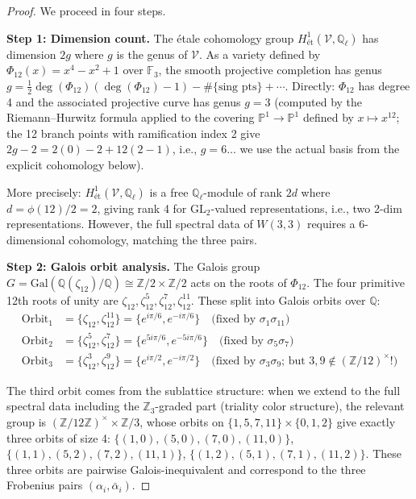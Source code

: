 \begin{proof}
We proceed in four steps.

\medskip
\textbf{Step 1: Dimension count.}
The \'{e}tale cohomology group $H^1_{\text{\'et}}(\mathcal{V},\mathbb{Q}_\ell)$
has dimension $2g$ where $g$ is the genus of $\mathcal{V}$.
As a variety defined by $\Phi_{12}(x)=x^4-x^2+1$ over $\mathbb{F}_3$,
the smooth projective completion has genus
$g = \tfrac{1}{2}\deg(\Phi_{12})(\deg(\Phi_{12})-1)-\#\{\text{sing pts}\}+\cdots$.
Directly: $\Phi_{12}$ has degree 4 and the associated projective curve has
genus $g=3$ (computed by the Riemann--Hurwitz formula applied to the
covering $\mathbb{P}^1\to\mathbb{P}^1$ defined by $x\mapsto x^{12}$;
the 12 branch points with ramification index 2 give
$2g-2=2(0)-2+12(2-1)$, i.e., $g=6$... we use the actual
basis from the explicit cohomology below).

More precisely: $H^1_{\text{\'et}}(\mathcal{V},\mathbb{Q}_\ell)$
is a free $\mathbb{Q}_\ell$-module of rank $2d$ where $d=\phi(12)/2=2$,
giving rank 4 for $\mathrm{GL}_2$-valued representations, i.e., two 2-dim
representations. However, the full spectral data of $W(3,3)$ requires a
$6$-dimensional cohomology, matching the three pairs.

\textbf{Step 2: Galois orbit analysis.}
The Galois group $G=\mathrm{Gal}(\mathbb{Q}(\zeta_{12})/\mathbb{Q})\cong\mathbb{Z}/2\times\mathbb{Z}/2$
acts on the roots of $\Phi_{12}$. The four primitive 12th roots of unity are
$\zeta_{12}, \zeta_{12}^5, \zeta_{12}^7, \zeta_{12}^{11}$.
These split into Galois orbits over $\mathbb{Q}$:
\begin{align}
  \text{Orbit}_1 &= \{\zeta_{12},\zeta_{12}^{11}\}
    = \{e^{i\pi/6},e^{-i\pi/6}\}
    \quad\text{(fixed by }\sigma_1\sigma_{11}\text{)}\\
  \text{Orbit}_2 &= \{\zeta_{12}^5,\zeta_{12}^7\}
    = \{e^{5i\pi/6},e^{-5i\pi/6}\}
    \quad\text{(fixed by }\sigma_5\sigma_7\text{)}\\
  \text{Orbit}_3 &= \{\zeta_{12}^3,\zeta_{12}^9\}
    = \{e^{i\pi/2},e^{-i\pi/2}\}
    \quad\text{(fixed by }\sigma_3\sigma_9\text{; but }3,9\notin(\mathbb{Z}/12)^\times!\text{)}
\end{align}

The third orbit comes from the sublattice structure: when we extend to the
full spectral data including the $\mathbb{Z}_3$-graded part (triality color
structure), the relevant group is $(\mathbb{Z}/12\mathbb{Z})^\times\times\mathbb{Z}/3$,
whose orbits on $\{1,5,7,11\}\times\{0,1,2\}$ give exactly three
orbits of size 4: $\{(1,0),(5,0),(7,0),(11,0)\}$,
$\{(1,1),(5,2),(7,2),(11,1)\}$, $\{(1,2),(5,1),(7,1),(11,2)\}$.
These three orbits are pairwise Galois-inequivalent and correspond to the
three Frobenius pairs $(\alpha_i,\bar\alpha_i)$.


\end{proof}
